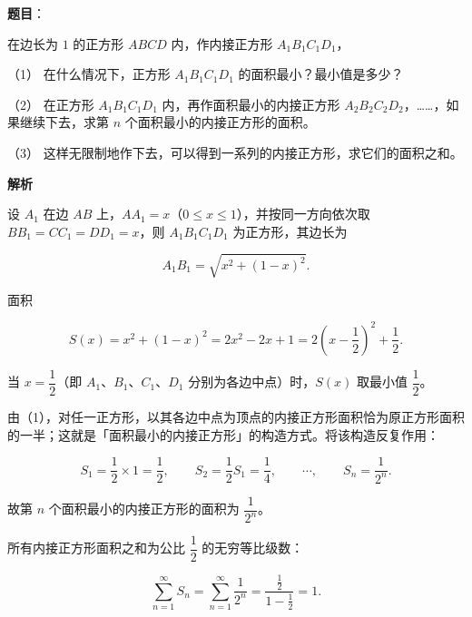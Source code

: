 \begin{answer}

\textbf{题目}：

在边长为 $1$ 的正方形 $ABCD$ 内，作内接正方形 $A_1B_1C_1D_1$，

（1） 在什么情况下，正方形 $A_1B_1C_1D_1$ 的面积最小？最小值是多少？

（2） 在正方形 $A_1B_1C_1D_1$ 内，再作面积最小的内接正方形 $A_2B_2C_2D_2$，……，如果继续下去，求第 $n$ 个面积最小的内接正方形的面积。

（3） 这样无限制地作下去，可以得到一系列的内接正方形，求它们的面积之和。
\nopagebreak[4]
\begin{center}\end{center}
\nopagebreak[4]
\textbf{解析}


设 $A_1$ 在边 $AB$ 上，$AA_1=x$（$0\le x\le1$），并按同一方向依次取 $BB_1=CC_1=DD_1=x$，则 $A_1B_1C_1D_1$ 为正方形，其边长为

\nopagebreak[4]
\[
A_1B_1=\sqrt{x^2+(1-x)^2}.
\]

面积

\nopagebreak[4]
\[
S(x)=x^2+(1-x)^2=2x^2-2x+1=2\left(x-\frac12\right)^2+\frac12.
\]

当 $x=\dfrac12$（即 $A_1\text{、}B_1\text{、}C_1\text{、}D_1$ 分别为各边中点）时，$S(x)$ 取最小值 $\dfrac12$。


由（1），对任一正方形，以其各边中点为顶点的内接正方形面积恰为原正方形面积的一半；这就是「面积最小的内接正方形」的构造方式。将该构造反复作用：

\nopagebreak[4]
\[
S_1=\frac12\times1=\frac12,\qquad S_2=\frac12S_1=\frac14,\qquad\cdots,\qquad S_n=\frac1{2^n}.
\]

故第 $n$ 个面积最小的内接正方形的面积为 $\dfrac1{2^n}$。


所有内接正方形面积之和为公比 $\dfrac12$ 的无穷等比级数：

\nopagebreak[4]
\[
\sum_{n=1}^{\infty}S_n=\sum_{n=1}^{\infty}\frac1{2^n}=\frac{\frac12}{1-\frac12}=1.
\]




\end{answer}
